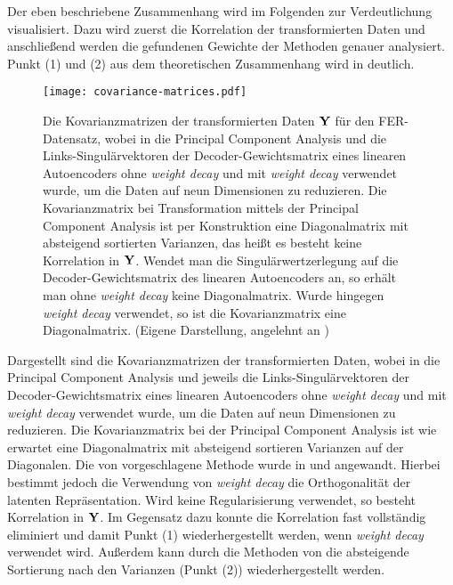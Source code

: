 Der eben beschriebene Zusammenhang wird im Folgenden zur Verdeutlichung visualisiert. Dazu wird
zuerst die Korrelation der transformierten Daten und anschließend werden die gefundenen Gewichte
der Methoden genauer analysiert. Punkt (1) und (2) aus dem theoretischen Zusammenhang wird in
 deutlich.
\begin{figure}[ht]
	\centering
	\texttt{[image: covariance-matrices.pdf]}
	\caption[Kovarianzmatrizen der transformierten Daten $\mat{Y}$ für den FER-Datensatz von drei Methoden]{Die Kovarianzmatrizen der transformierten Daten $\mat{Y}$ für den FER-Datensatz, wobei in \captiona die Principal Component Analysis und die Links-Singulärvektoren der Decoder-Gewichtsmatrix eines linearen Autoencoders \captionb ohne \textit{weight decay} und \captionc mit \textit{weight decay} verwendet wurde, um die Daten auf neun Dimensionen zu reduzieren. Die Kovarianzmatrix bei Transformation mittels der Principal Component Analysis ist per Konstruktion eine Diagonalmatrix mit absteigend sortierten Varianzen, das heißt es besteht keine Korrelation in $\mat{Y}$. Wendet man die Singulärwertzerlegung auf die Decoder-Gewichtsmatrix des linearen Autoencoders an, so erhält man ohne \textit{weight decay} keine Diagonalmatrix. Wurde hingegen \textit{weight decay} verwendet, so ist die Kovarianzmatrix eine Diagonalmatrix. (Eigene Darstellung, angelehnt an \textcite[5]{Plaut.2018})}
	\label{fig:Kovarianzmatrizen}
\end{figure} Dargestellt sind die Kovarianzmatrizen der transformierten Daten, wobei in \captiona die Principal Component Analysis und jeweils die Links-Singulärvektoren der Decoder-Gewichtsmatrix eines linearen Autoencoders \captionb ohne \textit{weight decay} und \captionc mit \textit{weight decay} verwendet wurde, um die Daten auf neun Dimensionen zu reduzieren. Die Kovarianzmatrix bei der Principal Component Analysis ist wie erwartet eine Diagonalmatrix mit absteigend sortieren Varianzen auf der Diagonalen. Die von \textcite{Plaut.2018} vorgeschlagene Methode wurde in \captionb und \captionc angewandt. Hierbei bestimmt jedoch die Verwendung von \textit{weight decay} die Orthogonalität der latenten Repräsentation. Wird keine Regularisierung verwendet, so besteht Korrelation in $\mat{Y}$. Im Gegensatz dazu konnte die Korrelation fast vollständig eliminiert und damit Punkt (1) wiederhergestellt werden, wenn \textit{weight decay} verwendet wird. Außerdem kann durch die Methoden von \textcite{Plaut.2018} die absteigende Sortierung nach den Varianzen (Punkt (2)) wiederhergestellt werden.

